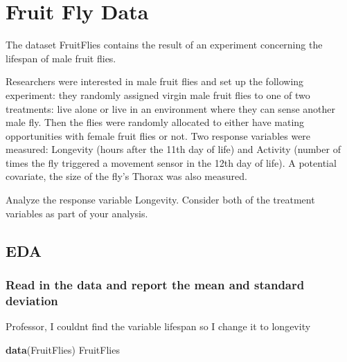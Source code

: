 \documentclass[]{article}
\newenvironment{Shaded}{\begin{snugshade}}{\end{snugshade}}
\newcommand{\KeywordTok}[1]{\textcolor[rgb]{0.13,0.29,0.53}{\textbf{#1}}}
\newcommand{\NormalTok}[1]{#1}
\begin{document}
\hypertarget{fruit-fly-data}{%
\section{Fruit Fly Data}\label{fruit-fly-data}}

The dataset FruitFlies contains the result of an experiment concerning
the lifespan of male fruit flies.

Researchers were interested in male fruit flies and set up the following
experiment: they randomly assigned virgin male fruit flies to one of two
treatments: live alone or live in an environment where they can sense
another male fly. Then the flies were randomly allocated to either have
mating opportunities with female fruit flies or not. Two response
variables were measured: Longevity (hours after the 11th day of life)
and Activity (number of times the fly triggered a movement sensor in the
12th day of life). A potential covariate, the size of the fly's Thorax
was also measured.

Analyze the response variable Longevity. Consider both of the treatment
variables as part of your analysis.

\hypertarget{eda-1}{%
\subsection{EDA}\label{eda-1}}

\hypertarget{read-in-the-data-and-report-the-mean-and-standard-deviation-1}{%
\subsubsection{Read in the data and report the mean and standard
deviation}\label{read-in-the-data-and-report-the-mean-and-standard-deviation-1}}

Professor, I couldnt find the variable lifespan so I change it to
longevity

\begin{Shaded}
\begin{Highlighting}[]
\KeywordTok{data}\NormalTok{(FruitFlies)}
\NormalTok{FruitFlies}
\end{Highlighting}
\end{Shaded}
\end{document}
